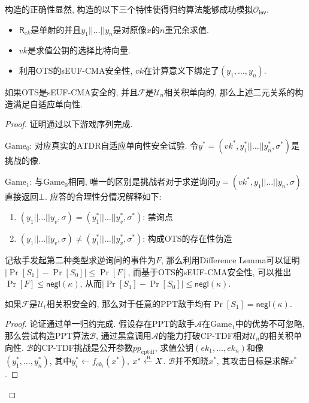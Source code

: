 构造的正确性显然, 构造的以下三个特性使得归约算法能够成功模拟$\mathcal{O}_\mathsf{inv}$.
\begin{itemize}
    \item $\mathsf{R}_{ek}$是单射的并且$y_1||\dots||y_n$是对原像$x$的$n$重冗余求值. 
    \item $vk$是求值公钥的选择比特向量. 
    \item 利用OTS的sEUF-CMA安全性, $vk$在计算意义下绑定了$(y_1, \dots, y_n)$.  
\end{itemize} 

\begin{theorem}
    如果OTS是sEUF-CMA安全的, 并且$\mathcal{F}$是$\mathcal{U}_n$相关积单向的, 那么上述二元关系的构造满足自适应单向性.
\end{theorem}

\begin{proof}
证明通过以下游戏序列完成. 
\begin{trivlist}
\item $\text{Game}_0$: 对应真实的ATDR自适应单向性安全试验. 令$y^* = (vk^*, y_1^*||\dots||y_n^*, \sigma^*)$是挑战的像. 

\item $\text{Game}_1$: 与$\text{Game}_0$相同, 唯一的区别是挑战者对于求逆询问$y = (vk^*, y_1||\dots||y_n, \sigma)$直接返回$\bot$. 
应答的合理性分情况解释如下:
\begin{enumerate}
    \item $(y_1||\dots||y_v, \sigma) = (y_1^*||\dots||y_v^*, \sigma^*)$: 禁询点
    \item $(y_1||\dots||y_v, \sigma) \neq (y_1^*||\dots||y_v^*, \sigma^*)$: 构成OTS的存在性伪造
\end{enumerate} 
记敌手发起第二种类型求逆询问的事件为$F$, 那么利用Difference Lemma可以证明$|\Pr[S_1] - \Pr[S_0]| \leq \Pr[F]$, 
而基于OTS的sEUF-CMA安全性, 可以推出$\Pr[F] \leq \mathsf{negl}(\kappa)$, 从而$|\Pr[S_1] - \Pr[S_0]| \leq \mathsf{negl}(\kappa)$. 
\end{trivlist}

\begin{claim}
如果$\mathcal{F}$是$\mathcal{U}_t$相关积安全的, 那么对于任意的PPT敌手均有$\Pr[S_1] = \mathsf{negl}(\kappa)$. 
\end{claim}

\begin{proof}
论证通过单一归约完成. 假设存在PPT的敌手$\mathcal{A}$在$\text{Game}_1$中的优势不可忽略, 
那么尝试构造PPT算法$\mathcal{B}$, 通过黑盒调用$\mathcal{A}$的能力打破CP-TDF相对$\mathcal{U}_n$的相关积单向性. 
$\mathcal{B}$的CP-TDF挑战是公开参数$pp_\text{cptdf}$, 
求值公钥$(ek_1, \dots, ek_n)$和像$(y_1^*, \dots, y_n^*)$, 
其中$y_i^* \leftarrow f_{ek_i}(x^*)$, $x^* \xleftarrow{\textup{\tiny R}} X$. 
$\mathcal{B}$并不知晓$x^*$, 其攻击目标是求解$x^*$. 


\end{proof}
\end{proof}

